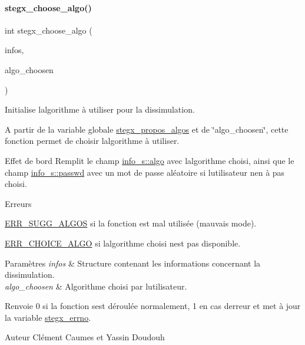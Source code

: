 \paragraph{\texorpdfstring{stegx\+\_\+choose\+\_\+algo()}{stegx\_choose\_algo()}}
{\footnotesize\ttfamily int stegx\+\_\+choose\+\_\+algo (\begin{DoxyParamCaption}\item[{\hyperlink{a00008_aa8ca908d92fb5bdd3c0a9e1f58b2cf03}{info\+\_\+s} $\ast$}]{infos,  }\item[{\hyperlink{a00008_adbe3e383e3f1c4239b26ccae2865aa06}{algo\+\_\+e}}]{algo\+\_\+choosen }\end{DoxyParamCaption})}



Initialise l\textquotesingle{}algorithme à utiliser pour la dissimulation. 

A partir de la variable globale \hyperlink{a00107_a855163fecb257950934ffba1b73ecae4}{stegx\+\_\+propos\+\_\+algos} et de \char`\"{}algo\+\_\+choosen\char`\"{}, cette fonction permet de choisir l\textquotesingle{}algorithme à utiliser. \begin{DoxyParagraph}{Effet de bord}
Remplit le champ \hyperlink{a00154_aa6ad0a3fe5b1489edc6684da68c3b588}{info\+\_\+s\+::algo} avec l\textquotesingle{}algorithme choisi, ainsi que le champ \hyperlink{a00154_a3b8cb37fa26cdca2b7460e14facd9ec0}{info\+\_\+s\+::passwd} avec un mot de passe aléatoire si l\textquotesingle{}utilisateur n\textquotesingle{}en à pas choisi. 
\end{DoxyParagraph}
\begin{DoxyRefDesc}{Erreurs}
\item[\hyperlink{a00134__errors000004}{Erreurs}]\hyperlink{a00011_a08b18ac8af0f3462354240d9732f3852a72cfc98feeed9df5050bd2b25d2d28c2}{E\+R\+R\+\_\+\+S\+U\+G\+G\+\_\+\+A\+L\+G\+OS} si la fonction est mal utilisée (mauvais mode). 

\hyperlink{a00011_a08b18ac8af0f3462354240d9732f3852ab79036268630b509f43f01d2082a9154}{E\+R\+R\+\_\+\+C\+H\+O\+I\+C\+E\+\_\+\+A\+L\+GO} si l\textquotesingle{}algorithme choisi n\textquotesingle{}est pas disponible. \end{DoxyRefDesc}

\begin{DoxyParams}{Paramètres}
{\em infos} & Structure contenant les informations concernant la dissimulation. \\
\hline
{\em algo\+\_\+choosen} & Algorithme choisi par l\textquotesingle{}utilisateur. \\
\hline
\end{DoxyParams}
\begin{DoxyReturn}{Renvoie}
0 si la fonction s\textquotesingle{}est déroulée normalement, 1 en cas d\textquotesingle{}erreur et met à jour la variable \hyperlink{a00062_a5ec48ccdfbe19fe23855818f8556abec}{stegx\+\_\+errno}. 
\end{DoxyReturn}
\begin{DoxyAuthor}{Auteur}
Clément Caumes et Yassin Doudouh 
\end{DoxyAuthor}


